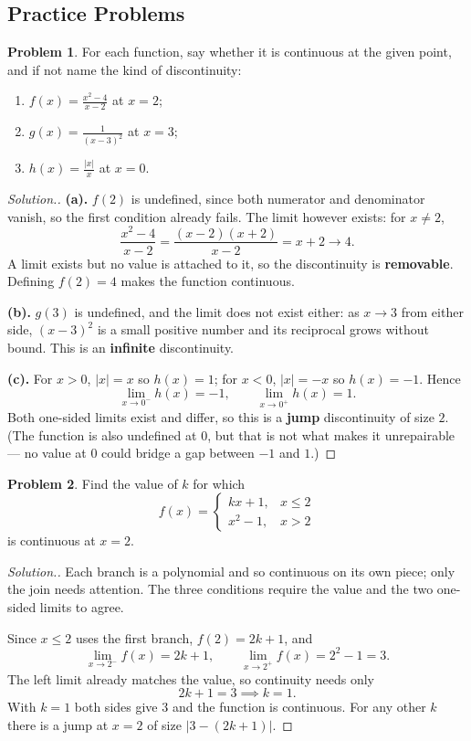 \documentclass[11pt,a4paper]{article}
\theoremstyle{definition}
\newtheorem{problemx}{Problem}[section]
\newenvironment{problem}{\begin{problemx}}{\end{problemx}}
\newenvironment{solution}
  {\renewcommand{\qedsymbol}{}\begin{proof}[\textit{Solution}.]}
  {\end{proof}}
\begin{document}
\subsection{Practice Problems}

\begin{problem}
For each function, say whether it is continuous at the given point, and if not
name the kind of discontinuity:
\begin{enumerate}
\item[(a).] $f(x)=\frac{x^{2}-4}{x-2}$ at $x=2$;
\item[(b).] $g(x)=\frac{1}{(x-3)^{2}}$ at $x=3$;
\item[(c).] $h(x)=\frac{\left|x\right|}{x}$ at $x=0$.
\end{enumerate}
\end{problem}

\begin{solution}
\textbf{(a).} $f(2)$ is undefined, since both numerator and denominator vanish, so
the first condition already fails. The limit however exists: for $x\neq 2$,
$$\frac{x^{2}-4}{x-2}=\frac{(x-2)(x+2)}{x-2}=x+2\longrightarrow 4 .$$
A limit exists but no value is attached to it, so the discontinuity is
\textbf{removable}. Defining $f(2)=4$ makes the function continuous.

\textbf{(b).} $g(3)$ is undefined, and the limit does not exist either: as
$x\to 3$ from either side, $(x-3)^{2}$ is a small positive number and its
reciprocal grows without bound. This is an \textbf{infinite} discontinuity.

\textbf{(c).} For $x>0$, $\left|x\right|=x$ so $h(x)=1$; for $x<0$,
$\left|x\right|=-x$ so $h(x)=-1$. Hence
$$\lim_{x\to 0^{-}}h(x)=-1,\qquad \lim_{x\to 0^{+}}h(x)=1 .$$
Both one-sided limits exist and differ, so this is a \textbf{jump} discontinuity
of size $2$. (The function is also undefined at $0$, but that is not what makes it
unrepairable --- no value at $0$ could bridge a gap between $-1$ and $1$.)
\end{solution}

\begin{problem}
Find the value of $k$ for which
$$f(x)=\begin{cases}
kx+1, & x\leq 2\\
x^{2}-1, & x>2
\end{cases}$$
is continuous at $x=2$.
\end{problem}

\begin{solution}
Each branch is a polynomial and so continuous on its own piece; only the join
needs attention. The three conditions require the value and the two one-sided
limits to agree.

Since $x\leq 2$ uses the first branch, $f(2)=2k+1$, and
$$\lim_{x\to 2^{-}}f(x)=2k+1,\qquad 
\lim_{x\to 2^{+}}f(x)=2^{2}-1=3 .$$
The left limit already matches the value, so continuity needs only
$$2k+1=3 \implies k=1 .$$
With $k=1$ both sides give $3$ and the function is continuous. For any other $k$
there is a jump at $x=2$ of size $\left|3-(2k+1)\right|$.
\end{solution}
\end{document}
